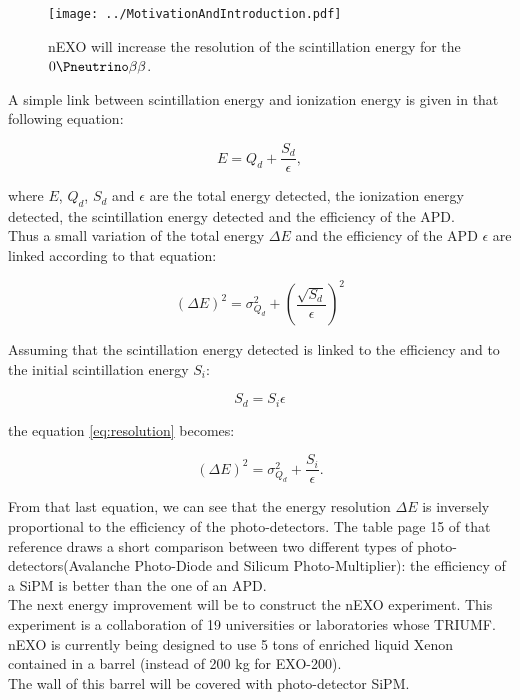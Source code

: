 \documentclass[a4paper, 11pt]{report}%
\begin{document}
  \begin{figure} [!hbtp]
  \centering 
    \texttt{[image: ../MotivationAndIntroduction.pdf]}  
    \caption{nEXO will increase the resolution of the scintillation energy for the \(0\Pneutrino\beta\beta\).}
    \label{fig:scintillation_ionization}    
  \end{figure}
  
  A simple link between scintillation energy and ionization energy is given in that following equation:
  
  \begin{equation}
   E = Q_{d} + \frac{S_{d}}{\epsilon},
  \end{equation}
  
  where $E$, $Q_{d}$, $S_{d}$ and $\epsilon$ are the total energy detected, the ionization energy detected, the 
  scintillation energy detected and the efficiency of the APD.\\
  Thus a small variation of the total energy $\Delta E$ and the efficiency of the APD $\epsilon$ are linked according to that 
  equation: 
  
  \begin{equation}\label{eq:resolution}
    (\Delta E)^{2} = \sigma_{Q_{d}}^{2} + (\frac{\sqrt{S_{d}}}{\epsilon})^{2}
  \end{equation}

  Assuming that the scintillation energy detected is linked to the efficiency and to the initial scintillation energy 
  $S_{i}$:
  
  \begin{equation}
    S_{d} = S_{i}\epsilon
  \end{equation}
  
  the equation \ref{eq:resolution} becomes:
  
  \begin{equation}
    (\Delta E)^{2} = \sigma_{Q_{d}}^{2} + \frac{S_{i}}{\epsilon}.
  \end{equation}
  
  From that last equation, we can see that the energy resolution $\Delta E$ is inversely proportional to the efficiency 
  of the photo-detectors. The table page 15 of that reference \cite{ref:motivation_and_introduction} draws a short 
  comparison between two different types of photo-detectors(Avalanche Photo-Diode and Silicum Photo-Multiplier):
  the efficiency of a SiPM is better than the one of an APD. 
  \\
  
  The next energy improvement will be to construct the nEXO experiment. This experiment is a collaboration of 
  19 universities or laboratories whose TRIUMF. nEXO is currently being designed to use 5 tons of enriched 
  liquid Xenon contained in a barrel (instead of 200 kg for EXO-200).\\
  The wall of this barrel will be covered with photo-detector SiPM.
    
\end{document}
